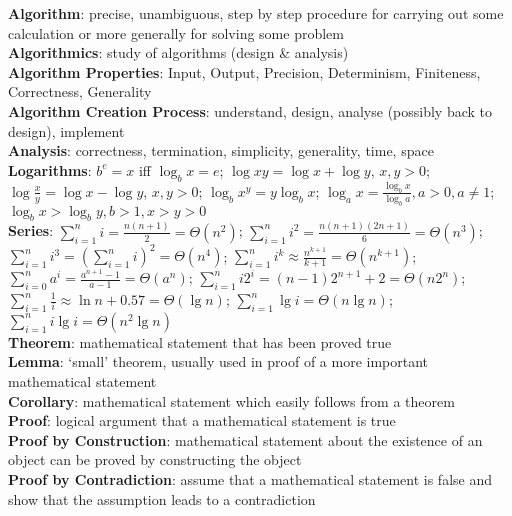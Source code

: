 \documentclass[a4paper]{article}
\begin{document}
    \begin{multicols}{2}
        \scriptsize
        \noindent\textbf{Algorithm}: precise, unambiguous, step by step procedure for carrying out some calculation or more generally for solving some problem\\
        \textbf{Algorithmics}: study of algorithms (design \& analysis)\\
        \textbf{Algorithm Properties}: Input, Output, Precision, Determinism, Finiteness, Correctness, Generality\\
        \textbf{Algorithm Creation Process}: understand, design, analyse (possibly back to design), implement\\
        \textbf{Analysis}: correctness, termination, simplicity, generality, time, space\\
        \textbf{Logarithms}: $b^e = x$ iff $\log_b x = e$; $\log xy = \log x + \log y$, $x, y > 0$; $\log \frac{x}{y} = \log x - \log y$, $x, y > 0$; $\log_b x^y = y \log_b x$; $\log_a x = \frac{\log_b x}{\log_b a}, a > 0, a \neq 1$; $\log_b x > \log_b y, b > 1, x > y > 0$\\
        \textbf{Series}: $\sum\nolimits_{i=1}^n i = \frac{n(n+1)}{2} = \Theta (n^2)$; $\sum\nolimits_{i=1}^n i^2 = \frac{n(n+1)(2n+1)}{6} = \Theta (n^3)$; $\sum\nolimits_{i=1}^n i^3 = {(\sum\nolimits_{i=1}^n i)}^2 = \Theta (n^4)$; $\sum\nolimits_{i=1}^n i^k \approx \frac{n^{k+1}}{k+1} = \Theta (n^{k+1})$; $\sum\nolimits_{i=0}^n a^i = \frac{a^{n+1}-1}{a-1} = \Theta (a^n)$; $\sum\nolimits_{i=1}^n i2^i = (n-1)2^{n+1}+2 = \Theta (n2^n)$; $\sum\nolimits_{i=1}^n \frac{1}{i} \approx \ln n + 0.57 = \Theta (\lg n)$; $\sum\nolimits_{i=1}^n \lg i = \Theta (n \lg n)$; $\sum\nolimits_{i=1}^n i \lg i = \Theta (n^2 \lg n)$\\
        \textbf{Theorem}: mathematical statement that has been proved true\\
        \textbf{Lemma}: `small' theorem, usually used in proof of a more important mathematical statement\\
        \textbf{Corollary}: mathematical statement which easily follows from a theorem\\
        \textbf{Proof}: logical argument that a mathematical statement is true\\
        \textbf{Proof by Construction}: mathematical statement about the existence of an object can be proved by constructing the object\\
        \textbf{Proof by Contradiction}: assume that a mathematical statement is false and show that the assumption leads to a contradiction\\

\end{multicols}
\end{document}

